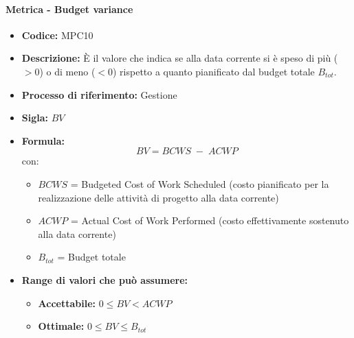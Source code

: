     \paragraph{Metrica - Budget variance}
        \begin{itemize}
            \item \textbf{Codice:} MPC10 
            \item \textbf{Descrizione:} È il valore che indica se alla data corrente si è speso di più ($>0$) o di meno ($<0$) rispetto a quanto pianificato dal budget totale $B_{tot}$.
            \item \textbf{Processo di riferimento:} Gestione
            \item \textbf{Sigla:} $BV$
            \item \textbf{Formula:} $$BV = {BCWS \; - \; ACWP}$$
            con:
            \begin{itemize}
                \item $BCWS$ = Budgeted Cost of Work Scheduled (costo pianificato per la realizzazione delle attività di progetto alla data corrente)
                \item $ACWP$ = Actual Cost of Work Performed (costo effettivamente sostenuto alla data corrente)
                \item $B_{tot}$ = Budget totale
            \end{itemize}
            \item \textbf{Range di valori che può assumere:}
            \begin{itemize}
                \item \textbf{Accettabile:} $0 \leq BV < ACWP$
                \item \textbf{Ottimale:} $0 \leq BV \leq B_{tot}$
            \end{itemize}
        \end{itemize}


